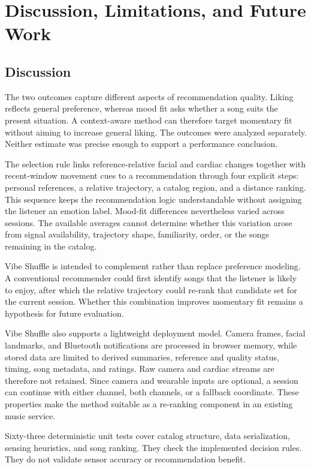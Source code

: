 \section{Discussion, Limitations, and Future Work}
\label{sec:discussion}

\subsection{Discussion}

The two outcomes capture different aspects of recommendation quality. Liking
reflects general preference, whereas mood fit asks whether a song suits the
present situation. A context-aware method can therefore target momentary fit
without aiming to increase general liking. The outcomes were analyzed
separately. Neither estimate was precise enough to support a performance
conclusion.

The selection rule links reference-relative facial and cardiac changes together
with recent-window movement cues to a recommendation through four explicit
steps: personal references, a relative trajectory, a catalog region, and a
distance ranking. This sequence keeps the recommendation logic
understandable without assigning the listener an emotion label. Mood-fit
differences nevertheless varied across sessions. The available averages cannot
determine whether this variation arose from signal availability, trajectory
shape, familiarity, order, or the songs remaining in the catalog.

Vibe Shuffle is intended to complement rather than replace preference
modeling. A conventional recommender could first identify songs that the
listener is likely to enjoy, after which the relative trajectory could re-rank
that candidate set for the current session. Whether this combination improves
momentary fit remains a hypothesis for future evaluation.

Vibe Shuffle also supports a lightweight deployment model. Camera frames,
facial landmarks, and Bluetooth notifications are processed in browser memory,
while stored data are limited to derived summaries, reference and quality
status, timing, song metadata, and ratings. Raw camera and cardiac streams are
therefore not retained. Since camera and wearable inputs are optional, a
session can continue with either channel, both channels, or a fallback
coordinate. These properties make the method suitable as a re-ranking
component in an existing music service.

Sixty-three deterministic unit tests cover catalog structure, data
serialization, sensing heuristics, and song ranking. They check the implemented
decision rules. They do not validate sensor accuracy or recommendation benefit.

